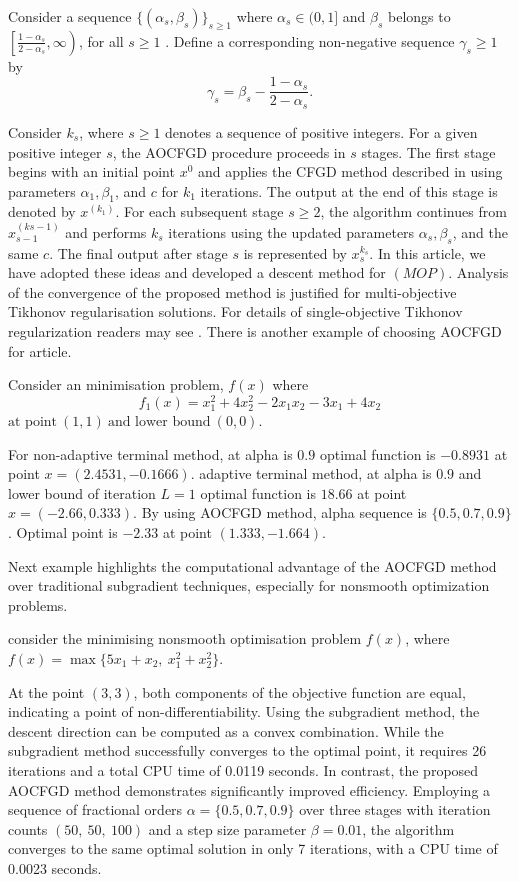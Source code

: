 \documentclass[smallextended,referee,envcountsect]{svjour3}
\begin{document}
Consider a sequence $\{(\alpha_s, \beta_s)\}_{s \geq 1}$ where 
$\alpha_s \in(0,1]$ and $\beta_s $  belongs to $ \left[\frac{1 - \alpha_s}{2 - \alpha_s}, \infty \right)$, for all $ s \geq 1$
. Define a corresponding non-negative sequence ${\gamma_s} \geq 1$ by \begin{equation*} \label{eq:gamma_s} \gamma_s = \beta_s - \frac{1 - \alpha_s}{2 - \alpha_s}. \end{equation*}

Consider ${k_s} $, where ${s \geq 1}$ denotes a sequence of positive integers. For a given positive integer $s$, the AOCFGD procedure proceeds in $s$ stages. The first stage begins with an initial point $x^{0}$ and applies the CFGD method described in \cite{72} using parameters $\alpha_1, \beta_1$, and $c$ for $k_1$ iterations. The output at the end of this stage is denoted by $x^{(k_1)}$. For each subsequent stage $s \geq 2$, the algorithm continues from $x_{s-1}^{(k{s-1})}$ and performs $k_s$ iterations using the updated parameters $\alpha_s, \beta_s$, and the same $c$. The final output after stage $s$ is represented by $x_s^{k_s}$. In this article, we have adopted these ideas and developed a descent method for $(MOP)$. Analysis of the convergence of the proposed method is justified for multi-objective Tikhonov regularisation solutions. For details of single-objective Tikhonov regularization readers may see \cite{72}. There is another example of choosing AOCFGD for article.
 \begin{example}Consider an minimisation problem, $f(x)$ where $$f_1(x)=x_1^2+ 4 x_2^2-2x_1 x_2 - 3 x_1 + 4x_2$$
 $\text{at point}~ (1,1)~ \text{and lower bound}~(0,0).$  
 
     For non-adaptive terminal method, at alpha is $0.9$ optimal function is $-0.8931$ at point $x=(2.4531, -0.1666)$. 
      adaptive terminal method, at alpha is $0.9$ and lower bound of iteration $L=1$ optimal function is $18.66$ at point $x=(-2.66, 0.333)$.
      By using AOCFGD method, alpha sequence is $\{0.5,0.7,0.9\}$. Optimal point is $-2.33$ at point $(1.333, -1.664)$.
 \end{example}
Next example highlights the computational advantage of the AOCFGD method over traditional subgradient techniques, especially for nonsmooth optimization problems. 
\begin{example}consider the minimising nonsmooth optimisation problem $f(x)$,
{where} \quad $f(x) = \max\{5x_1 + x_2,\ x_1^2 + x_2^2\}$.
\end{example}
At the point \( (3, 3) \), both components of the objective function are equal, indicating a point of non-differentiability. Using the subgradient method, the descent direction can be computed as a convex combination. While the subgradient method successfully converges to the optimal point, it requires 26 iterations and a total CPU time of 0.0119 seconds. In contrast, the proposed AOCFGD method demonstrates significantly improved efficiency. Employing a sequence of fractional orders \( \alpha = \{0.5, 0.7, 0.9\} \) over three stages with iteration counts \( (50,\ 50,\ 100) \) and a step size parameter \( \beta = 0.01 \), the algorithm converges to the same optimal solution in only 7 iterations, with a CPU time of 0.0023 seconds.
\end{document}
